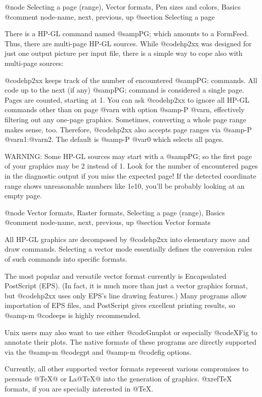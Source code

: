 @node Selecting a page (range), Vector formats, Pen sizes and colors, Basics
@comment  node-name,  next,  previous,  up
@section Selecting a page

There is a HP-GL command named @samp{PG;} which amounts to a FormFeed.
Thus, there are multi-page HP-GL sources. While @code{hp2xx} was
designed for just one output picture per input file, there is a
simple way to cope also with multi-page sources:

@code{hp2xx} keeps track of the number of encountered @samp{PG;} commands.
All code up to the next (if any) @samp{PG;} command is considered a
single page. Pages are counted, starting at 1. You can ask @code{hp2xx}
to ignore all HP-GL commands other than on page @var{n} with option
@samp{-P @var{n}}, effectively filtering out any one-page graphics.
Sometimes, converting a whole page range makes sense, too. Therefore,
@code{hp2xx} also accepts page ranges via @samp{-P @var{n1}:@var{n2}}.
The default is @samp{-P @var{0}} which selects all pages.

WARNING: Some HP-GL sources may start with a @samp{PG;} so the first
page of your graphics may be 2 instead of 1. Look for the number of
encountered pages in the diagnostic output if you miss the expected page!
If the detected coordinate range shows unreasonable numbers like 1e10,
you'll be probably looking at an empty page.




@node Vector formats, Raster formats, Selecting a page (range), Basics
@comment  node-name,  next,  previous,  up
@section Vector formats

All HP-GL graphics are decomposed by @code{hp2xx} into elementary
move and draw commands. Selecting a vector mode essentially defines the
conversion rules of such commands into specific formats.

The most popular and versatile vector format currently is
Encapsulated PostScript (EPS). (In fact, it is much more than just a
vector graphics format, but @code{hp2xx} uses only EPS's line drawing
features.) Many programs allow importation of EPS files, and PostScript
gives excellent printing results, so @samp{-m @code{eps}} is highly
recommended.

Unix users may also want to use either @code{Gnuplot} or especially @code{XFig}
to annotate their plots. The native formats of these programs are directly
supported via the @samp{-m @code{gpt}} and @samp{-m @code{fig}} options.

Currently, all other supported vector formats represent various compromises
to persuade @TeX{}@ or La@TeX{}@ into the generation of graphics.
@xref{TeX formats}, if you are specially interested in @TeX{}.



